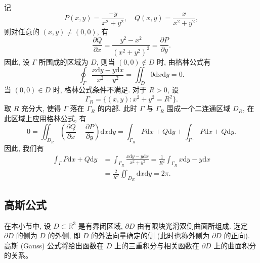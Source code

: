 \documentclass[12pt,fontset=fandol]{ctexart}
\begin{document}
\begin{solve}\quad 记
\[
  P(x,y)=\frac{-y}{x^2+y^2},\quad Q(x,y)=\frac{x}{x^2+y^2},
\]
则对任意的 $(x,y)\ne(0,0)$, 有
\[
  \frac{\partial Q}{\partial x}=\frac{y^2-x^2}{(x^2+y^2)^2}=\frac{\partial P}{\partial y}.
\]
因此, 设 $\Gamma$ 所围成的区域为 $D$, 则当 $(0,0)\notin D$ 时, 由格林公式有
\[
  \oint_\Gamma\frac{x\mathrm dy-y\mathrm dx}{x^2+y^2}
  =\iint_D0\mathrm dx\mathrm dy=0.
\]
当 $(0,0)\in D$ 时, 格林公式条件不满足. 对于 $R>0$, 设
\[
  \Gamma_R=\{(x,y):x^2+y^2=R^2\}.
\]
取 $R$ 充分大, 使得 $\Gamma$ 落在 $\Gamma_R$ 的内部. 此时 $\Gamma$ 与 $\Gamma_R$ 围成一个二连通区域 $D_R$, 在此区域上应用格林公式, 有
\[
  0=\iint_{D_R}\left(\frac{\partial Q}{\partial x}-\frac{\partial P}{\partial y}\right)\mathrm dx\mathrm dy
  =\int_{\Gamma_R}P\mathrm dx+Q\mathrm dy+\int_{\Gamma^-}P\mathrm dx+Q\mathrm dy.
\]
因此, 我们有
\[
\begin{aligned}
  \int_\Gamma P\mathrm dx+Q\mathrm dy
  &=\int_{\Gamma_R}\frac{x\mathrm dy-y\mathrm dx}{x^2+y^2}
    =\frac1{R^2}\int_{\Gamma_R}x\mathrm dy-y\mathrm dx\\
  &=\frac2{R^2}\iint_{D_R}\mathrm dx\mathrm dy=2\pi.
\end{aligned}
\]

\end{solve}
\subsection{高斯公式}

在本小节中, 设 $D\subset\mathbb R^3$ 是有界闭区域, $\partial D$ 由有限块光滑双侧曲面所组成. 选定 $\partial D$ 的侧为 $D$ 的外侧, 即 $D$ 的外法向量确定的侧 (此时也称外侧为 $\partial D$ 的正向). 高斯 (Gauss) 公式将给出函数在 $D$ 上的三重积分与相关函数在 $\partial D$ 上的曲面积分的关系。
\end{document}
